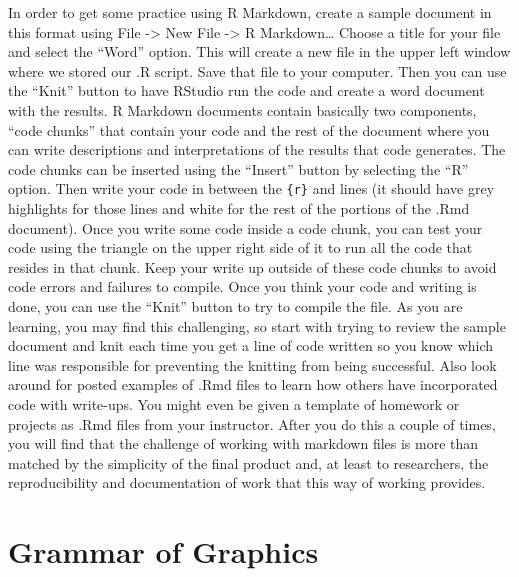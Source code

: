 \documentclass[
]{book}
\begin{document}
\indent In order to get some practice using R Markdown, create a sample document
in this format using File -\textgreater{} New File -\textgreater{} R Markdown\ldots{} Choose a title for your
file and select the ``Word'' option. This will create a new file in the upper left
window where we stored our .R script. Save that file to your computer. Then you
can use the ``Knit'' button to have RStudio run the code and create a word
document with the results. R Markdown documents contain basically two
components, ``code chunks'' that contain your code and the rest of the document
where you can write descriptions and interpretations of the results that code
generates. The code chunks can be inserted using the ``Insert'' button by
selecting the ``R'' option. Then write your code in between the
\texttt{\textasciigrave{}\textasciigrave{}\textasciigrave{}\{r\}} and \texttt{\textasciigrave{}\textasciigrave{}\textasciigrave{}} lines (it should have grey highlights for those lines
and white for the rest of the portions of the .Rmd document). Once you write
some code inside a code chunk, you can test your code using the triangle on the
upper right side of it to run all the code that resides in that chunk. Keep your
write up outside of these code chunks to avoid code errors and failures to
compile. Once you think your code and writing is done, you can use the ``Knit''
button to try to compile the file. As you are learning, you may find this
challenging, so start with trying to review the sample document and knit each
time you get a line of code written so you know which line was responsible for
preventing the knitting from being successful. Also look around for posted
examples of .Rmd files to learn how others have incorporated code with
write-ups. You might even be given a template of homework or projects as .Rmd
files from your instructor. After you do this a couple of times, you will find
that the challenge of working with markdown files is more than matched by the
simplicity of the final product and, at least to researchers, the
reproducibility and documentation of work that this way of working provides.

\hypertarget{section1-5}{%
\section{Grammar of Graphics}\label{section1-5}}
\end{document}
